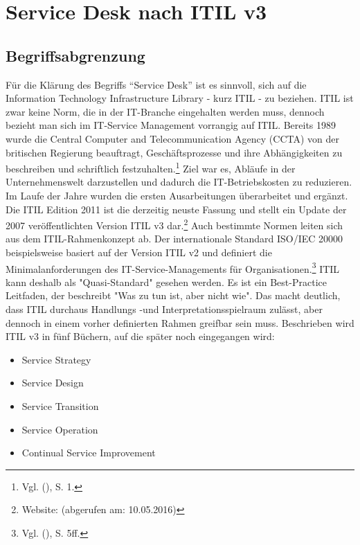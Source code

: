 \section{Service Desk nach ITIL v3}

\subsection{Begriffsabgrenzung}
\noindent Für die Klärung des Begriffs \enquote{Service Desk} ist es sinnvoll, sich auf die Information Technology Infrastructure Library - kurz ITIL - zu beziehen.
ITIL ist zwar keine Norm, die in der IT-Branche eingehalten werden muss, dennoch bezieht man sich im IT-Service Management vorrangig auf ITIL.
Bereits 1989 wurde die Central Computer and Telecommunication Agency (CCTA) von der britischen Regierung beauftragt, Geschäftsprozesse und ihre Abhängigkeiten zu beschreiben und schriftlich festzuhalten.\footnote{Vgl. \citeauthor{Olbrich} (\citeyear{Olbrich}), S. 1.}
Ziel war es, Abläufe in der Unternehmenswelt darzustellen und dadurch die IT-Betriebskosten zu reduzieren. Im Laufe der Jahre wurden die ersten Ausarbeitungen überarbeitet und ergänzt. Die ITIL Edition 2011 ist die derzeitig neuste Fassung und stellt ein Update der 2007 veröffentlichten Version ITIL v3 dar.\footnote{Website: \citeauthor{Andenmatten} (abgerufen am: 10.05.2016)}
Auch bestimmte Normen leiten sich aus dem ITIL-Rahmenkonzept ab. Der internationale Standard ISO/IEC 20000 beispielsweise basiert auf der Version ITIL v2 und definiert die Minimalanforderungen des IT-Service-Managements für Organisationen.\footnote{Vgl. \citeauthor{Buchsein} (\citeyear{Buchsein}), S. 5ff.}
ITIL kann deshalb als "Quasi-Standard" gesehen werden. Es ist ein  Best-Practice Leitfaden, der beschreibt "Was zu tun ist, aber nicht wie". Das macht deutlich, dass ITIL durchaus Handlungs -und Interpretationsspielraum zulässt, aber dennoch in einem vorher definierten Rahmen greifbar sein muss. Beschrieben wird ITIL v3 in fünf Büchern, auf die später noch eingegangen wird:

\begin{itemize}
\item Service Strategy
\item Service Design
\item Service Transition
\item Service Operation
\item Continual Service Improvement
\end{itemize}

